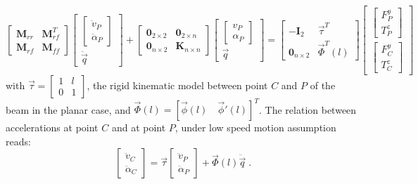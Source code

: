 \begin{equation}\label{eq:2nd}
\left[\begin{array}{cc}\mathbf{M}_{rr} & \mathbf{M}_{rf}^T \\\mathbf{M}_{rf} & \mathbf{M}_{ff} \end{array}\right]\left[\begin{array}{c}\left[\begin{array}{c}\ddot{v}_P\\\ddot{\alpha}_P\end{array}\right] \\ \ddot{\vec{q}} \end{array}\right]+\left[\begin{array}{cc}\mathbf{0}_{2\times 2} &  \mathbf{0}_{2\times n}\\ \mathbf{0}_{n\times 2} & \mathbf{K}_{n\times n} \end{array}\right]\left[\begin{array}{c} \left[\begin{array}{c} v_P\\ \alpha_P\end{array}\right] \\ \vec{q} \end{array}\right]=\left[\begin{array}{cc} -\mathbf{I}_2 & \vec{\tau}^T \\\mathbf{0}_{n\times 2} &  \vec{\Phi}^T(l) \end{array}\right]\left[\begin{array}{c}\left[\begin{array}{c} F^y_P \\ T^z_P \end{array}\right] \\ \left[\begin{array}{c} F^y_C\\ T^z_C\end{array}\right] \end{array}\right]
\end{equation}
with $\vec{\tau}=\left[\begin{array}{cc}1 & l\\ 0 & 1 \end{array}\right]$, the rigid  kinematic model between point $C$ and $P$ of the beam in the planar case, and $\vec{\Phi}(l)=[\vec{\phi}(l)\quad \vec{\phi}'(l)]^T$. The relation between accelerations at point $C$ and at point $P$, under low speed motion assumption reads:
\begin{equation}\label{eq:acc1}
\left[\begin{array}{c}\ddot{v}_C\\\ddot{\alpha}_C \end{array}\right]=\vec{\tau}\left[\begin{array}{c}\ddot{v}_P\\\ddot{\alpha}_P \end{array}\right]+\vec{\Phi}(l)\ddot{\vec{q}}\;.
\end{equation}
